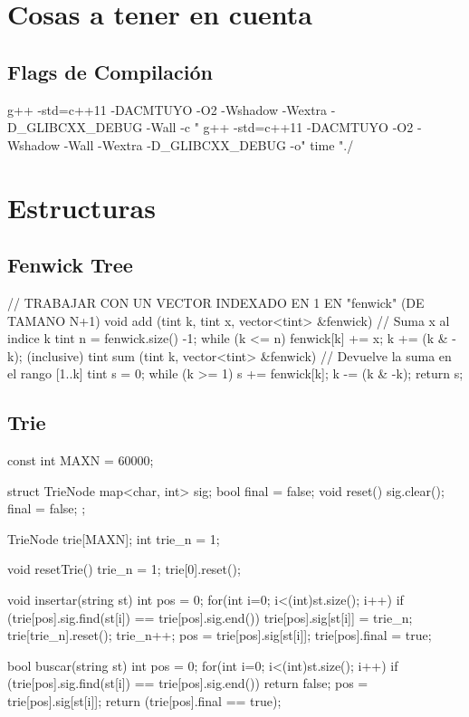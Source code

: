 \section*{Cosas a tener en cuenta}
\subsection*{Flags de Compilaci\'on}
\begin{code}
g++ -std=c++11 -DACMTUYO -O2 -Wshadow -Wextra -D_GLIBCXX_DEBUG -Wall -c "%
g++ -std=c++11 -DACMTUYO -O2 -Wshadow -Wall -Wextra -D_GLIBCXX_DEBUG -o"%
time "./%
\end{code}

\section{Estructuras}

\subsection{Fenwick Tree}
\begin{code}
// TRABAJAR CON UN VECTOR INDEXADO EN 1 EN "fenwick" (DE TAMANO N+1)
void add (tint k, tint x, vector<tint> &fenwick) // Suma x al indice k 
{
	tint n = fenwick.size() -1;
	while (k <= n)
	{
		fenwick[k] += x;
		k += (k & -k);
	}
}																																     (inclusive)
tint sum (tint k, vector<tint> &fenwick) // Devuelve la suma en el rango [1..k] 
{
	tint s = 0;
	while (k >= 1)
	{
		s += fenwick[k];
		k -= (k & -k);
	}
	return s;
}
\end{code}

\subsection{Trie}
\begin{code}
const int MAXN = 60000;

struct TrieNode {
  map<char, int> sig; 
  bool final = false;
  void reset() { sig.clear(); final = false; }
};

TrieNode trie[MAXN];
int trie_n = 1;

void resetTrie() {
  trie_n = 1;
  trie[0].reset();
}

void insertar(string st) {
  int pos = 0;
  for(int i=0; i<(int)st.size(); i++) {
    if (trie[pos].sig.find(st[i]) == trie[pos].sig.end()) {
      trie[pos].sig[st[i]] = trie_n;
      trie[trie_n].reset();
      trie_n++;
    }
    pos = trie[pos].sig[st[i]];
  }
  trie[pos].final = true;
}

bool buscar(string st) {
  int pos = 0;
  for(int i=0; i<(int)st.size(); i++) {
    if (trie[pos].sig.find(st[i]) == trie[pos].sig.end())
      return false;
    pos = trie[pos].sig[st[i]];
  }
  return (trie[pos].final == true);
}
\end{code}

